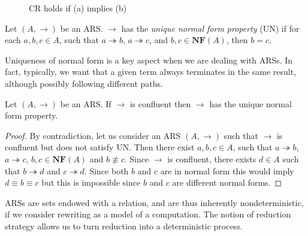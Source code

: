 \begin{figure}
	\centering
	\qquad
	\caption{CR holds if (a) implies (b)}
	\label{figure:confluence}
\end{figure}
\begin{definition}
	Let $(A,\rightarrow)$ be an ARS. $\rightarrow$ has the \emph{unique normal form property} (UN) if for each $a,b,c\in A$, such that $a\twoheadrightarrow b$, $a\twoheadrightarrow c$, and $b,c\in\mathbf{NF}(A)$, then $b= c$.
\end{definition}
Uniqueness of normal form is a key aspect when we are dealing with ARSs. In fact, typically, we want that a given term always terminates in the same result, although possibly following different paths.
\begin{proposition}
	Let $(A,\rightarrow)$ be an ARS. If $\rightarrow$ is confluent then $\rightarrow$ has the unique normal form property.
\end{proposition}
\begin{proof}
	By contradiction, let us consider an ARS $(A,\rightarrow)$ such that $\rightarrow$ is confluent but does not satisfy UN. Then there exist $a,b,c\in A$, such that $a\twoheadrightarrow b$, $a\twoheadrightarrow c$, $b,c\in\mathbf{NF}(A)$ and $b\not\equiv c$. Since $\rightarrow$ is confluent, there exists $d\in A$ such that $b\twoheadrightarrow d$ and $c\twoheadrightarrow d$. Since both $b$ and $c$ are in normal form this would imply $d\equiv b\equiv c$ but this is impossible since $b$ and $c$ are different normal forms.
\end{proof}
ARSs are sets endowed with a relation, and are thus
inherently nondeterministic, if we consider rewriting as a model of a computation. The notion of reduction strategy allows us to turn reduction into a deterministic process.
